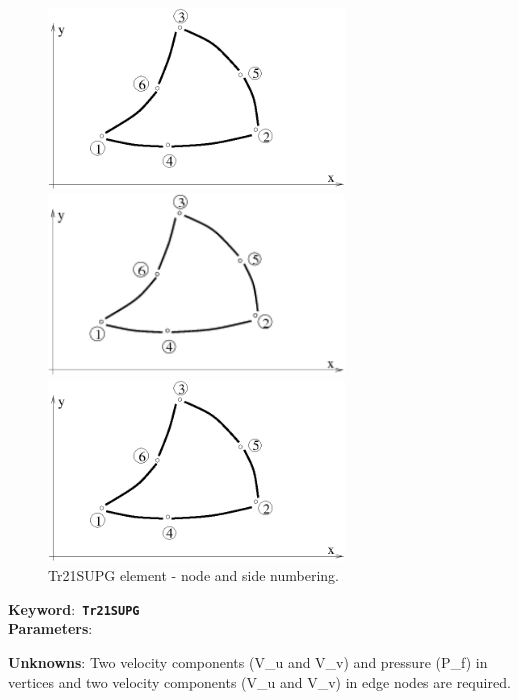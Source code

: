 \documentclass[a4paper]{article}
\newcommand{\descitem}[1]{{\noindent \bf #1}:}
\newcommand{\elemkeyword}[1]{\descitem{Keyword}~{\bf \texttt{#1}}}
\begin{document}
\begin{figure}[htb]
\begin{htmlonly}
  \centerline{\includegraphics[width=0.7\textwidth]{qtrplanstrss.eps}}
\end{htmlonly}
\ifpdf
\centerline{\includegraphics[width=0.7\textwidth]{qtrplanstrss.pdf}}
\else
\centerline{\includegraphics[width=0.7\textwidth]{qtrplanstrss.eps}}
\fi
\caption{Tr21SUPG element - node and side numbering.}
\label{Tr21SUPGfig}
\end{figure}

\elemkeyword{Tr21SUPG}\\
\descitem{Parameters}

\descitem{Unknowns}
Two velocity components (V\_u and V\_v) and pressure (P\_f) in vertices and two velocity components (V\_u and V\_v) in edge nodes are required.
\end{document}
